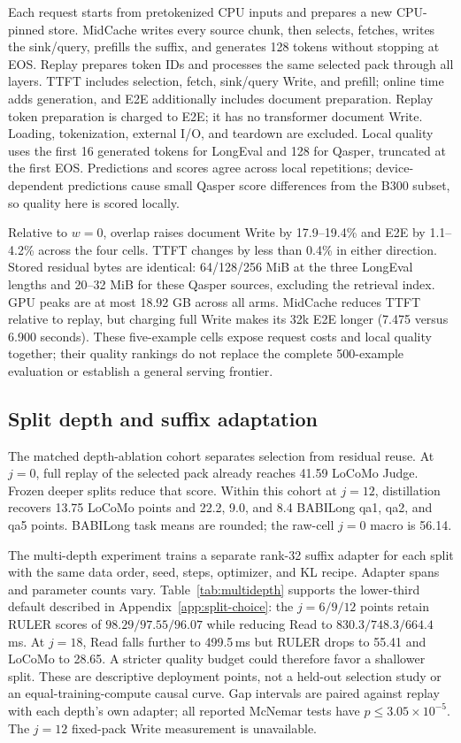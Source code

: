 Each request starts from pretokenized CPU inputs and prepares a new CPU-pinned store. MidCache writes every source chunk, then selects, fetches, writes the sink/query, prefills the suffix, and generates 128 tokens without stopping at EOS. Replay prepares token IDs and processes the same selected pack through all layers. TTFT includes selection, fetch, sink/query Write, and prefill; online time adds generation, and E2E additionally includes document preparation. Replay token preparation is charged to E2E; it has no transformer document Write. Loading, tokenization, external I/O, and teardown are excluded. Local quality uses the first 16 generated tokens for LongEval and 128 for Qasper, truncated at the first EOS. Predictions and scores agree across local repetitions; device-dependent predictions cause small Qasper score differences from the B300 subset, so quality here is scored locally.

Relative to $w=0$, overlap raises document Write by 17.9--19.4\% and E2E by 1.1--4.2\% across the four cells. TTFT changes by less than 0.4\% in either direction. Stored residual bytes are identical: 64/128/256 MiB at the three LongEval lengths and 20--32 MiB for these Qasper sources, excluding the retrieval index. GPU peaks are at most 18.92 GB across all arms. MidCache reduces TTFT relative to replay, but charging full Write makes its 32k E2E longer (7.475 versus 6.900 seconds). These five-example cells expose request costs and local quality together; their quality rankings do not replace the complete 500-example evaluation or establish a general serving frontier.

\subsection{Split depth and suffix adaptation}



The matched depth-ablation cohort separates selection from residual reuse. At $j=0$, full replay of the selected pack already reaches 41.59 LoCoMo Judge. Frozen deeper splits reduce that score. Within this cohort at $j=12$, distillation recovers 13.75 LoCoMo points and 22.2, 9.0, and 8.4 BABILong qa1, qa2, and qa5 points. BABILong task means are rounded; the raw-cell $j=0$ macro is 56.14.

The multi-depth experiment trains a separate rank-32 suffix adapter for each split with the same data order, seed, steps, optimizer, and KL recipe. Adapter spans and parameter counts vary. Table~\ref{tab:multidepth} supports the lower-third default described in Appendix~\ref{app:split-choice}: the $j=6/9/12$ points retain RULER scores of $98.29/97.55/96.07$ while reducing Read to $830.3/748.3/664.4$\,ms. At $j=18$, Read falls further to 499.5\,ms but RULER drops to 55.41 and LoCoMo to 28.65. A stricter quality budget could therefore favor a shallower split. These are descriptive deployment points, not a held-out selection study or an equal-training-compute causal curve. Gap intervals are paired against replay with each depth's own adapter; all reported McNemar tests have $p\leq3.05\times10^{-5}$. The $j=12$ fixed-pack Write measurement is unavailable.

